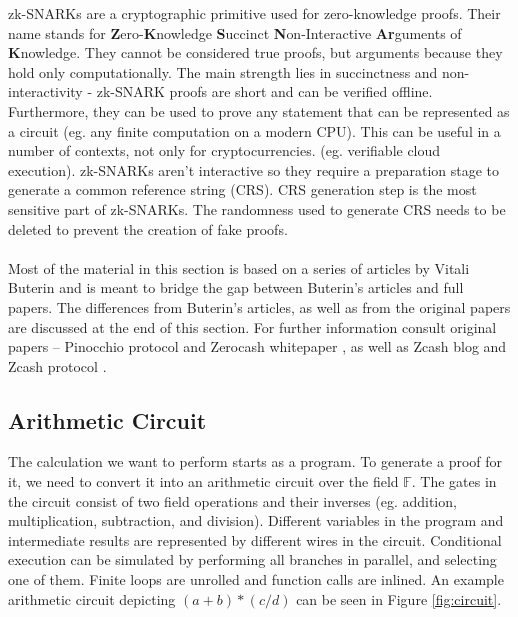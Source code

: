 zk-SNARKs are a cryptographic primitive used for zero-knowledge proofs. Their name stands for \textbf{Z}ero-\textbf{K}nowledge \textbf{S}uccinct \textbf{N}on-Interactive \textbf{Ar}guments of \textbf{K}nowledge. They cannot be considered true proofs, but arguments because they hold only computationally. The main strength lies in succinctness and non-interactivity - zk-SNARK proofs are short and can be verified offline. Furthermore, they can be used to prove any statement that can be represented as a circuit (eg. any finite computation on a modern CPU). This can be useful in a number of contexts, not only for cryptocurrencies. (eg. verifiable cloud execution). zk-SNARKs aren't interactive so they require a preparation stage to generate a common reference string (CRS). CRS generation step is the most sensitive part of zk-SNARKs. The randomness used to generate CRS needs to be deleted to prevent the creation of fake proofs.\\
\\
Most of the material in this section is based on a series of articles by Vitali Buterin \cite{buterin1, buterin2, buterin3} and is meant to bridge the gap between Buterin's articles and full papers. The differences from Buterin's articles, as well as from the original papers are discussed at the end of this section. For further information consult original papers -- Pinocchio protocol\cite{parno2013pinocchio} and Zerocash whitepaper \cite{sasson2014zerocash}, as well as Zcash blog \cite{zcashzksnarks} and Zcash protocol \cite{zcashprotocol}. %

\subsection{Arithmetic Circuit}

The calculation we want to perform starts as a program. To generate a proof for it, we need to convert it into an arithmetic circuit over the field $\mathbb{F}$. The gates in the circuit consist of two field operations and their inverses (eg. addition, multiplication, subtraction, and division). Different variables in the program and intermediate results are represented by different wires in the circuit. Conditional execution can be simulated by performing all branches in parallel, and selecting one of them. Finite loops are unrolled and function calls are inlined. An example arithmetic circuit  depicting $(a+b)*(c/d)$ can be seen in Figure \ref{fig:circuit}.


